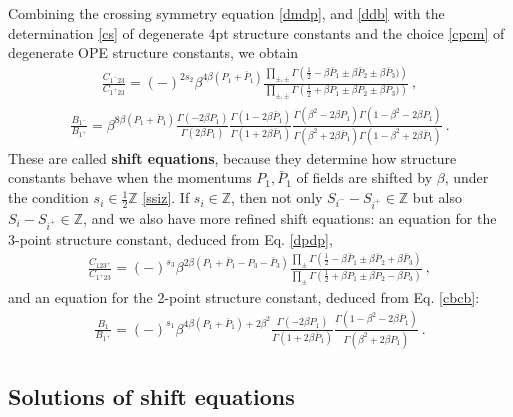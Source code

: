 \documentclass[12pt, a4paper]{article}
\theoremstyle{break}
\begin{document}
Combining the crossing symmetry equation \eqref{dmdp}, and \eqref{ddb} with the determination \eqref{cs} of degenerate 4pt structure constants and the choice \eqref{cpcm} of degenerate OPE structure constants, we obtain
\begin{align}
 \boxed{\frac{C_{1^-23}}{C_{1^+23}} = 
 (-)^{2s_2}\beta^{4\beta (P_1+\bar P_1)} \frac{\prod_{\pm,\pm}\Gamma\left(\tfrac12 -\beta\bar P_1\pm\beta \bar P_2\pm\beta \bar P_3)\right)}{\prod_{\pm,\pm}
 \Gamma\left(\tfrac12 +\beta P_1\pm \beta P_2\pm\beta P_3)\right)}} \ ,
 \label{sh-mp}
\end{align}
\begin{align}
\boxed{\frac{B_{1^-}}{B_{1^+}} =
\beta^{8\beta (P_1+\bar P_1)} 
 \frac{\Gamma(-2\beta P_1)}{\Gamma(2\beta P_1)} \frac{\Gamma(1-2\beta \bar P_1)}{\Gamma(1+2\beta \bar P_1)}
 \frac{\Gamma\left(\beta^2-2\beta P_1\right)\Gamma\left(1-\beta^2-2\beta P_1\right)}{\Gamma\left(\beta^2+2\beta \bar P_1\right)\Gamma\left(1-\beta^2+2\beta \bar P_1\right)}}\ .
 \label{sh-b}
\end{align}
These are called \textbf{shift equations}, because they determine how structure constants behave when the momentums $P_1,\bar P_1$ of fields are shifted by $\beta$, under the condition $s_i\in \frac12 \mathbb{Z}$ \eqref{ssiz}. If $s_i\in\mathbb{Z}$, then not only $S_{i^-}-S_{i^+}\in\mathbb{Z}$ but also $S_{i}-S_{i^+}\in\mathbb{Z}$, and we also have more refined shift equations: an equation for the 3-point structure constant, deduced from Eq. \eqref{dpdp},
\begin{align}
 \boxed{\frac{C_{123^+}}{C_{1^+23}} = 
 (-)^{s_3} \beta^{2\beta(P_1+\bar P_1-P_3-\bar P_3)}
 \frac{ \prod_\pm\Gamma\left(\frac12 -\beta\bar P_1 \pm \beta\bar P_2 +\beta\bar P_3\right)}{ \prod_\pm\Gamma\left(\frac12+\beta P_1 \pm \beta P_2 -\beta P_3\right)}}\ ,
 \label{sh-pp}
\end{align}
and an equation for the 2-point structure constant, deduced from Eq. \eqref{cbcb}:
\begin{align}
 \boxed{\frac{B_1}{B_{1^+}} =  (-)^{s_1}\beta^{4\beta (P_1+\bar P_1)+2\beta^2}\frac{\Gamma(-2\beta P_1)}{\Gamma(1+2\beta \bar P_1)}\frac{\Gamma(1-\beta^2-2\beta\bar P_1)}{\Gamma(\beta^2+2\beta P_1)} }\ .
 \label{sh-bb}
\end{align}

\subsection{Solutions of shift equations}\label{sec:essc}
\end{document}
